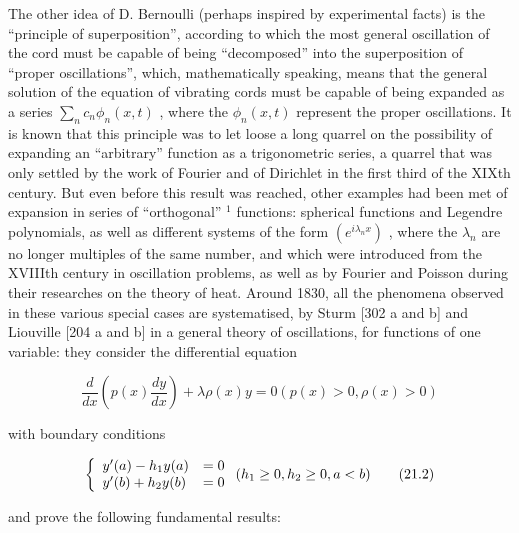 The other idea of D. Bernoulli (perhaps inspired by experimental facts) is the ``principle of superposition'', according to which the most general oscillation of the cord must be capable of being ``decomposed'' into the superposition of ``proper oscillations'', which, mathematically speaking, means that the general solution of the equation of vibrating cords must be capable of being expanded as a series \(\sum_{n} c_{n} \phi_{n}(x, t)\) , where the \(\phi_{n}(x, t)\) represent the proper oscillations. It is known that this principle was to let loose a long quarrel on the possibility of expanding an ``arbitrary'' function as a trigonometric series, a quarrel that was only settled by the work of Fourier and of Dirichlet in the first third of the XIXth century. But even before this result was reached, other examples had been met of expansion in series of ``orthogonal'' \(^{1}\) functions: spherical functions and Legendre polynomials, as well as different systems of the form \((e^{i\lambda_{n}x})\) , where the \(\lambda_{n}\) are no longer multiples of the same number, and which were introduced from the XVIIIth century in oscillation problems, as well as by Fourier and Poisson during their researches on the theory of heat. Around 1830, all the phenomena observed in these various special cases are systematised, by Sturm {[}302 a and b{]} and Liouville {[}204 a and b{]} in a general theory of oscillations, for functions of one variable: they consider the differential equation

\[
\frac {d}{d x} \left(p (x) \frac {d y}{d x}\right) + \lambda \rho (x) y = 0 (p (x) > 0, \rho (x) > 0)\tag{21.1}
\]

with boundary conditions

\[
\left\{ \begin{array}{l l} y ^ {\prime} (a) - h _ {1} y (a) & = 0 \\ y ^ {\prime} (b) + h _ {2} y (b) & = 0 \end{array} \right. (h _ {1} \geq 0, h _ {2} \geq 0, a <   b)\tag{21.2}
\]

and prove the following fundamental results:

